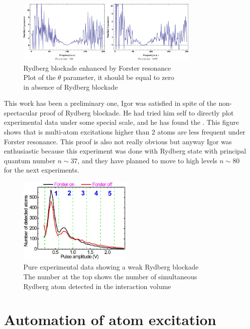 \documentclass[twoside, open=right
]{scrreprt}
\begin{document}
\begin{figure}[h]
  \centering
  \includegraphics[width=0.8\textwidth]{forster.pdf}
  \caption{\label{forster} Rydberg blockade enhanced by Forster resonance \\ Plot of the $\theta$ parameter, it should be equal to zero\\ in absence of Rydberg blockade}
\end{figure}

\par This work has been a preliminary one, Igor was satisfied in spite of the non-spectacular proof of Rydberg blockade. He had tried him self to directly plot experimental data under some special scale, and he has found the . This figure shows that is multi-atom excitations higher than 2 atoms are less frequent under Forster resonance. This proof is also not really obvious but anyway Igor was enthusiastic because this experiment was done with Rydberg state with principal quantum number $n \sim 37$, and they have planned to move to high levels $n \sim 80$ for the next experiments.

\begin{figure}[h]
  \centering
  \includegraphics[width=0.5\textwidth]{igor-ryd.png}
  \caption{\label{igor-ryd} Pure experimental data showing a weak Rydberg blockade\\ The number at the top shows the number of simultaneous\\ Rydberg atom detected in the interaction volume}
\end{figure}

\chapter{Automation of atom excitation}
\end{document}
